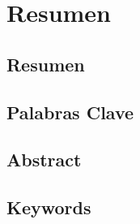 \chapter*{Resumen}

\section*{Resumen}


\section*{Palabras Clave}

\newpage

\section*{Abstract}


\section*{Keywords}
